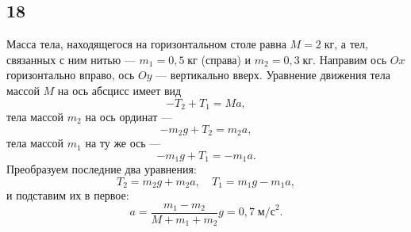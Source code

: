 \subsection{18}

Масса тела, находящегося на горизонтальном столе равна $M=2\;\text{кг}$, а тел, связанных с ним нитью --- $m_1=0{,}5\;\text{кг}$ (справа) и $m_2=0{,}3\;\text{кг}$. Направим ось $Ox$ горизонтально вправо, ось $Oy$ --- вертикально вверх. Уравнение движения тела массой $M$ на ось абсцисс имеет вид
\[
-T_2+T_1=Ma,
\]
тела массой $m_2$ на ось ординат ---
\[
-m_2g+T_2=m_2a,
\]
тела массой $m_1$ на ту же ось ---
\[
-m_1g+T_1=-m_1a.
\]
Преобразуем последние два уравнения:
\[
T_2=m_2g+m_2a,\quad T_1=m_1g-m_1a,
\]
и подставим их в первое:
\[
a=\frac{m_1-m_2}{M+m_1+m_2}g=0{,}7\;\text{м/с}^2.
\]